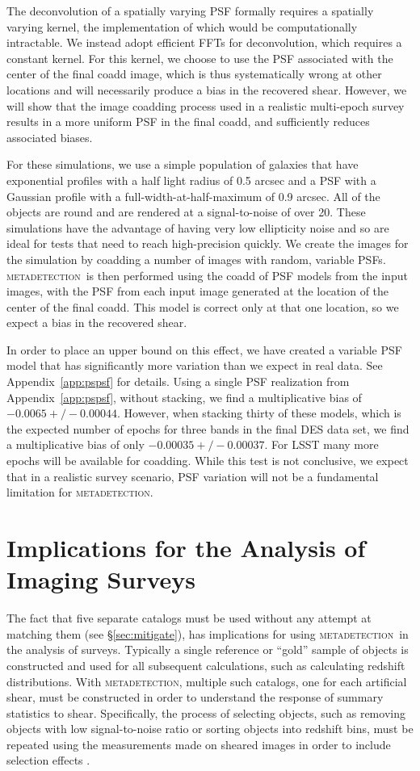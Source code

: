 \documentclass[fleqn,useAMS,usenatbib]{mnras}
\newcommand{\mdet}{\textsc{metadetection}}
\begin{document}
The deconvolution of a spatially varying PSF formally requires a spatially
varying kernel, the implementation of which would be computationally
intractable.  We instead adopt efficient FFTs for deconvolution, which requires
a constant kernel.  For this kernel, we choose to use the PSF associated with
the center of the final coadd image, which is thus systematically wrong at
other locations and will necessarily produce a bias in the recovered shear.
However, we will show that the image coadding process used in a realistic
multi-epoch survey results in a more uniform PSF in the final coadd, and
sufficiently reduces associated biases.

For these simulations, we use a simple population of galaxies that have
exponential profiles with a half light radius of 0.5 arcsec and a PSF with a
Gaussian profile with a full-width-at-half-maximum of 0.9 arcsec. All of the
objects are round and are rendered at a signal-to-noise of over 20. These
simulations have the advantage of having very low ellipticity noise and so are
ideal for tests that need to reach high-precision quickly. We create the images
for the simulation by coadding a number of images with random, variable PSFs.
\mdet\ is then performed using the coadd of PSF models from the input images,
with the PSF from each input image generated at the location of the center of
the final coadd.  This model is correct only at that one location, so we
expect a bias in the recovered shear.

In order to place an upper bound on this effect, we have created a variable PSF
model that has significantly more variation than we expect in real data. See
Appendix~\ref{app:pspsf} for details.  Using a single PSF realization from
Appendix~\ref{app:pspsf}, without stacking, we find a multiplicative bias of
$-0.0065 +/- 0.00044$.  However, when stacking thirty of these models, which is
the expected number of epochs for three bands in the final DES data set, we
find a multiplicative bias of only $-0.00035 +/- 0.00037$.  For LSST many more
epochs will be available for coadding.   While this test is not conclusive, we
expect that in a realistic survey scenario, PSF variation will not be a
fundamental limitation for \mdet.

\section{Implications for the Analysis of Imaging Surveys} \label{sec:wavg}

The fact that five separate catalogs must be used without any attempt at
matching them (see \S \ref{sec:mitigate}), has implications for using \mdet\ in
the analysis of surveys.  Typically a single reference or ``gold'' sample of
objects is constructed and used for all subsequent calculations, such as
calculating redshift distributions.  With \mdet, multiple such catalogs, one
for each artificial shear, must be constructed in order to understand the
response of summary statistics to shear.  Specifically, the process of
selecting objects, such as removing objects with low signal-to-noise ratio or
sorting objects into redshift bins, must be repeated using the measurements made on
sheared images in order to include selection effects \citep{SheldonMcal2017}.
\end{document}
